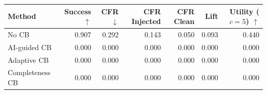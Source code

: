 \begin{tabular}{lrrrrrr}
\toprule
Method & Success $\uparrow$ & CFR $\downarrow$ & CFR Injected & CFR Clean & Lift & Utility ($c=5$) $\uparrow$ \\
\midrule
No CB & 0.907 & 0.292 & 0.143 & 0.050 & 0.093 & 0.440 \\
AI-guided CB & 0.000 & 0.000 & 0.000 & 0.000 & 0.000 & 0.000 \\
Adaptive CB & 0.000 & 0.000 & 0.000 & 0.000 & 0.000 & 0.000 \\
Completeness CB & 0.000 & 0.000 & 0.000 & 0.000 & 0.000 & 0.000 \\
\bottomrule
\end{tabular}
